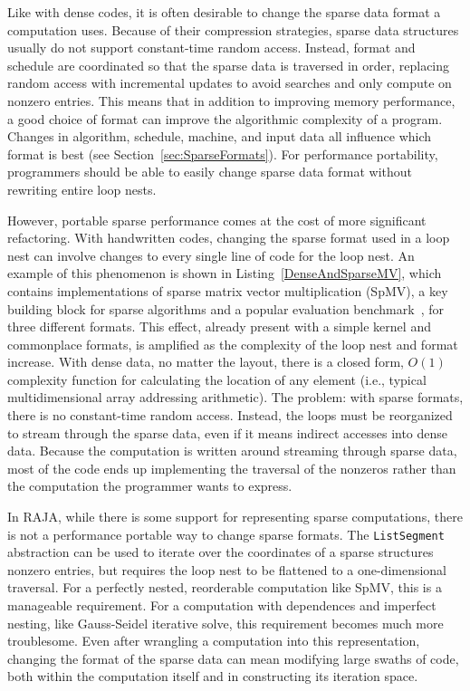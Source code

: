 Like with dense codes, it is often desirable to change the sparse data format a computation uses.
Because of their compression strategies, sparse data structures usually do not support constant-time random access.
Instead, format and schedule are coordinated so that the sparse data is traversed in order, replacing random access with incremental updates to avoid searches and only compute on nonzero entries.
This means that in addition to improving memory performance, a good choice of format can improve the algorithmic complexity of a program.
Changes in algorithm, schedule, machine, and input data all influence which format is best (see Section~\ref{sec:SparseFormats}).
For performance portability, programmers should be able to easily change sparse data format without rewriting entire loop nests.


However, portable sparse performance comes at the cost of more significant refactoring.
With handwritten codes, changing the sparse format used in a loop nest can involve changes to every single line of code for the loop nest.
An example of this phenomenon is shown in Listing~\ref{DenseAndSparseMV}, which contains implementations of sparse matrix vector multiplication (SpMV), a key building block for sparse algorithms and a popular evaluation benchmark~\cite{bell2009implementing,buluc2009parallel,liu2013efficient,langr2015evaluation}, for three different formats.
This effect, already present with a simple kernel and commonplace formats, is amplified as the complexity of the loop nest and format increase.
With dense data, no matter the layout, there is a closed form, $O(1)$ complexity function for calculating the location of any element (i.e., typical multidimensional array addressing arithmetic).
The problem: with sparse formats, there is no constant-time random access.
Instead, the loops must be reorganized to stream through the sparse data, even if it means indirect accesses into dense data.
Because the computation is written around streaming through sparse data, most of the code ends up implementing the traversal of the nonzeros rather than the computation the programmer wants to express.


  
In RAJA, while there is some support for representing sparse computations, there is not a performance portable way to change sparse formats.
The \verb.ListSegment. abstraction can be used to iterate over the coordinates of a sparse structures nonzero entries, but requires the loop nest to be flattened to a one-dimensional traversal.
For a perfectly nested, reorderable computation like SpMV, this is a manageable requirement.
For a computation with dependences and imperfect nesting, like Gauss-Seidel iterative solve, this requirement becomes much more troublesome.
Even after wrangling a computation into this representation, changing the format of the sparse data can mean modifying large swaths of code, both within the computation itself and in constructing its iteration space.

